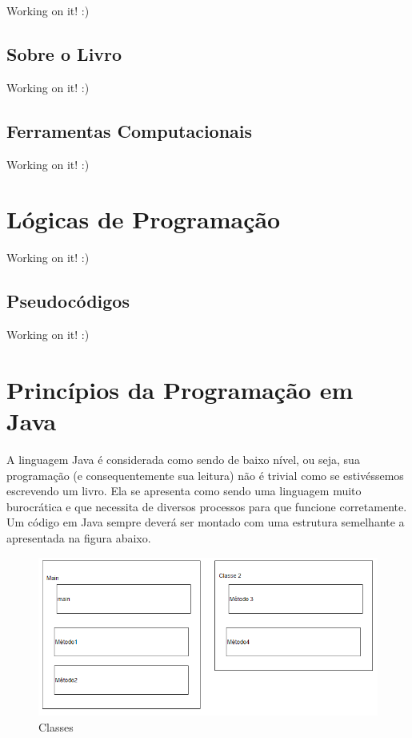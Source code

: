 \documentclass[
]{book}
\begin{document}
Working on it! :)

\hypertarget{sobre-o-livro}{%
\section*{Sobre o Livro}\label{sobre-o-livro}}

Working on it! :)

\hypertarget{ferramentas-computacionais}{%
\section*{Ferramentas Computacionais}\label{ferramentas-computacionais}}

Working on it! :)

\hypertarget{luxf3gicas-de-programauxe7uxe3o}{%
\chapter{Lógicas de Programação}\label{luxf3gicas-de-programauxe7uxe3o}}

Working on it! :)

\hypertarget{pseudocuxf3digos}{%
\section{Pseudocódigos}\label{pseudocuxf3digos}}

Working on it! :)

\hypertarget{princuxedpios-da-programauxe7uxe3o-em-java}{%
\chapter{Princípios da Programação em Java}\label{princuxedpios-da-programauxe7uxe3o-em-java}}

A linguagem Java é considerada como sendo de baixo nível, ou seja, sua programação (e consequentemente sua leitura) não é trivial como se estivéssemos escrevendo um livro. Ela se apresenta como sendo uma linguagem muito burocrática e que necessita de diversos processos para que funcione corretamente. Um código em Java sempre deverá ser montado com uma estrutura semelhante a apresentada na figura abaixo.

\begin{figure}
\centering
\includegraphics{imagens/imagem clases.png}
\caption{Classes}
\end{figure}
\end{document}
